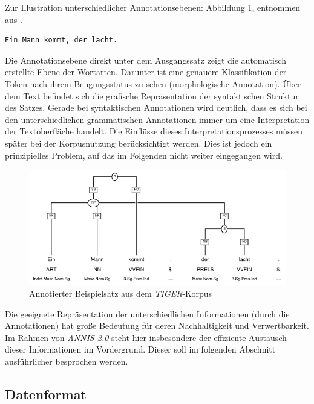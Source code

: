 Zur Illustration unterschiedlicher Annotationsebenen: Abbildung \ref{fig:tiger-example1}, entnommen aus \citet[][]{lezius02}.

\begin{verbatim}Ein Mann kommt, der lacht.\end{verbatim}

Die Annotationsebene direkt unter dem Ausgangssatz zeigt die automatisch erstellte Ebene der Wortarten. Darunter ist eine genauere Klassifikation der Token nach ihrem Beugungsstatus zu sehen (morphologische Annotation). Über dem Text befindet sich die grafische Repräsentation der syntaktischen Struktur des Satzes. Gerade bei syntaktischen Annotationen wird deutlich, dass es sich bei den unterschiedlichen grammatischen Annotationen immer um eine Interpretation der Textoberfläche handelt. Die Einflüsse dieses Interpretationsprozesses müssen später bei der Korpusnutzung berücksichtigt werden. Dies ist jedoch ein prinzipielles Problem, auf das im Folgenden nicht weiter eingegangen wird.

\begin{figure}[H]
	\centering
	\includegraphics*[width=1.0\textwidth]{figures/tiger-example1}
	\caption{Annotierter Beispielsatz aus dem \emph{TIGER}-Korpus}
	\label{fig:tiger-example1}
\end{figure}

Die geeignete Repräsentation der unterschiedlichen Informationen (durch die Annotationen) hat große Bedeutung für deren Nachhaltigkeit und Verwertbarkeit. Im Rahmen von \emph{ANNIS 2.0} steht hier insbesondere der effiziente Austausch dieser Informationen im Vordergrund. Dieser soll im folgenden Abschnitt ausführlicher besprochen werden.

\subsection{Datenformat}\label{sec:Korpussuche.Datenformat}

